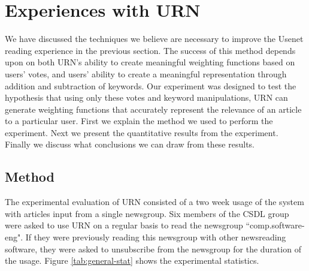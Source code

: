 
\section{Experiences with URN}



We have discussed the techniques we believe are necessary to improve the
Usenet reading experience in the previous section. The success of this
method depends upon on both URN's ability to create meaningful weighting
functions based on users' votes, and users' ability to create a meaningful
representation through addition and subtraction of keywords. Our experiment
was designed to test the hypothesis that using only these votes and keyword
manipulations, URN can generate weighting functions that accurately
represent the relevance of an article to a particular user. First we
explain the method we used to perform the experiment. Next we present the
quantitative results from the experiment.  Finally we discuss what
conclusions we can draw from these results.

\subsection{Method}

The experimental evaluation of URN consisted of a two week usage of the
system with articles input from a single newsgroup. Six members of the
CSDL group were asked to use URN on a regular basis to read the newsgroup
``comp.software-eng".  If they were previously reading this newsgroup with
other newsreading software, they were asked to unsubscribe from the
newsgroup for the duration of the usage. Figure \ref{tab:general-stat}
shows the experimental statistics.

